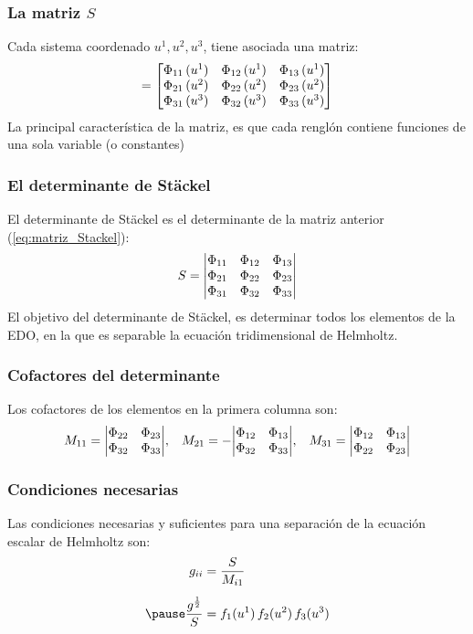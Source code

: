 \documentclass[12pt]{beamer}
\begin{document}
\begin{frame}
\frametitle{La matriz $S$}
Cada sistema coordenado $u^{1}, u^{2}, u^{3}$, tiene asociada una matriz:
\pause
\begin{align}
[S] = \mqty[
\Phi_{11} \, (u^{1}) & \Phi_{12} \, (u^{1}) & \Phi_{13} \, (u^{1}) \\
\Phi_{21} \, (u^{2}) & \Phi_{22} \, (u^{2}) & \Phi_{23} \, (u^{2}) \\
\Phi_{31} \, (u^{3}) & \Phi_{32} \, (u^{3}) & \Phi_{33} \, (u^{3})
]
\label{eq:matriz_Stackel}
\end{align}
\pause
La principal característica de la matriz, es que cada renglón contiene funciones de una sola variable (o constantes)
\end{frame}
\begin{frame}
\frametitle{El determinante de Stäckel}
El determinante de Stäckel es el determinante de la matriz anterior (\ref{eq:matriz_Stackel}):
\pause
\begin{align}
S = \mqty|
\Phi_{11} & \Phi_{12} & \Phi_{13} \\
\Phi_{21} & \Phi_{22} & \Phi_{23} \\
\Phi_{31} & \Phi_{32} & \Phi_{33}
|
\label{eq:determinante_Stackel}
\end{align}
\pause
El objetivo del determinante de Stäckel, es determinar todos los elementos de la EDO, en la que es separable la ecuación tridimensional de Helmholtz.
\end{frame}
\begin{frame}
\frametitle{Cofactores del determinante}
Los cofactores de los elementos en la primera columna son:
\begin{align*}
M_{11} = \mqty|
\Phi_{22} & \Phi_{23} \\
\Phi_{32} & \Phi_{33}
| , \hspace{0.3cm}
M_{21} = -\mqty|
\Phi_{12} & \Phi_{13} \\
\Phi_{32} & \Phi_{33}
| , \hspace{0.3cm}
M_{31} = \mqty|
\Phi_{12} & \Phi_{13} \\
\Phi_{22} & \Phi_{23}
|
\end{align*}
\end{frame}
\begin{frame}
\frametitle{Condiciones necesarias}
Las condiciones necesarias y suficientes para una separación de la ecuación escalar de Helmholtz son:
\pause
\begin{equation}
\begin{aligned}
g_{ii} &= \dfrac{S}{M_{i1}} \\[0.5em] \pause
\dfrac{g^{\frac{1}{2}}}{S} &= f_{1} (u^{1}) \, f_{2} (u^{2}) \, f_{3} (u^{3})
\label{eq:ecuaciones_condiciones}
\end{aligned}  
\end{equation}
\end{frame}
\end{document}
